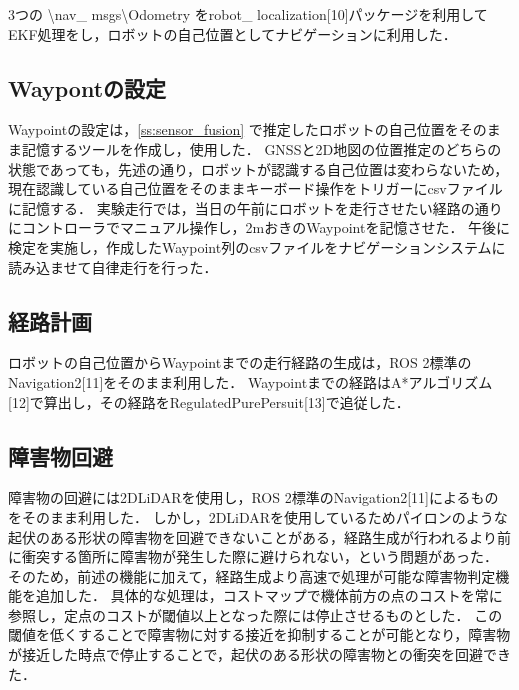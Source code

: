 \documentclass[platex,dvipdfmx]{rbproceedings}
\begin{document}
3つの \textbackslash nav\_ msgs\textbackslash Odometry をrobot\_ localization[10]パッケージを利用してEKF処理をし，ロボットの自己位置としてナビゲーションに利用した．

\subsection{Waypontの設定}
Waypointの設定は，\ref{ss:sensor_fusion} で推定したロボットの自己位置をそのまま記憶するツールを作成し，使用した．
GNSSと2D地図の位置推定のどちらの状態であっても，先述の通り，ロボットが認識する自己位置は変わらないため，現在認識している自己位置をそのままキーボード操作をトリガーにcsvファイルに記憶する．
実験走行では，当日の午前にロボットを走行させたい経路の通りにコントローラでマニュアル操作し，2mおきのWaypointを記憶させた．
午後に検定を実施し，作成したWaypoint列のcsvファイルをナビゲーションシステムに読み込ませて自律走行を行った．

\subsection{経路計画}
ロボットの自己位置からWaypointまでの走行経路の生成は，ROS 2標準のNavigation2[11]をそのまま利用した．
Waypointまでの経路はA*アルゴリズム[12]で算出し，その経路をRegulatedPurePersuit[13]で追従した．

\subsection{障害物回避} \label{ss:avoidance}
障害物の回避には2DLiDARを使用し，ROS 2標準のNavigation2[11]によるものをそのまま利用した．
しかし，2DLiDARを使用しているためパイロンのような起伏のある形状の障害物を回避できないことがある，経路生成が行われるより前に衝突する箇所に障害物が発生した際に避けられない，という問題があった．
そのため，前述の機能に加えて，経路生成より高速で処理が可能な障害物判定機能を追加した．
具体的な処理は，コストマップで機体前方の点のコストを常に参照し，定点のコストが閾値以上となった際には停止させるものとした．
この閾値を低くすることで障害物に対する接近を抑制することが可能となり，障害物が接近した時点で停止することで，起伏のある形状の障害物との衝突を回避できた．
\end{document}
